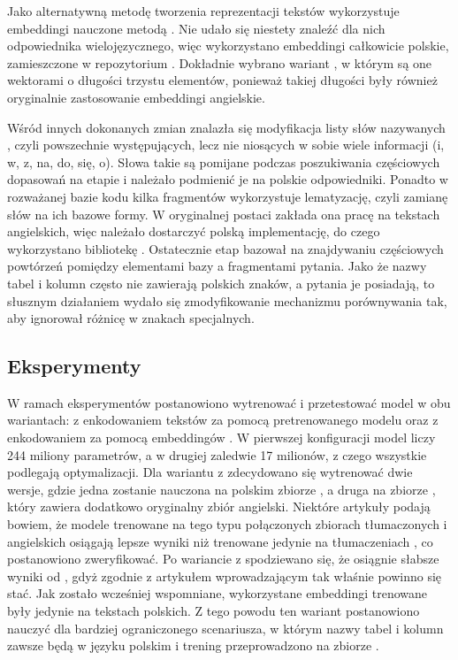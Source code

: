Jako alternatywną metodę tworzenia reprezentacji tekstów  wykorzystuje embeddingi nauczone metodą . Nie udało się niestety znaleźć dla nich odpowiednika wielojęzycznego, więc wykorzystano embeddingi całkowicie polskie, zamieszczone w repozytorium  . Dokładnie wybrano wariant , w którym są one wektorami o długości trzystu elementów, ponieważ takiej długości były również oryginalnie zastosowanie embeddingi angielskie.

Wśród innych dokonanych zmian znalazła się modyfikacja listy słów nazywanych , czyli powszechnie występujących, lecz nie niosących w sobie wiele informacji (i, w, z, na, do, się, o). Słowa takie są pomijane podczas poszukiwania częściowych dopasowań na etapie  i należało podmienić je na polskie odpowiedniki. Ponadto w rozważanej bazie kodu kilka fragmentów wykorzystuje lematyzację, czyli zamianę słów na ich bazowe formy. W oryginalnej postaci zakłada ona pracę na tekstach angielskich, więc należało dostarczyć polską implementację, do czego wykorzystano bibliotekę . Ostatecznie etap  bazował na znajdywaniu częściowych powtórzeń pomiędzy elementami bazy a fragmentami pytania. Jako że nazwy tabel i kolumn często nie zawierają polskich znaków, a pytania je posiadają, to słusznym działaniem wydało się zmodyfikowanie mechanizmu porównywania tak, aby ignorował różnicę w znakach specjalnych.

\subsection{Eksperymenty}

W ramach eksperymentów postanowiono wytrenować i przetestować model  w obu wariantach: z enkodowaniem tekstów za pomocą pretrenowanego modelu  oraz z enkodowaniem za pomocą embeddingów . W pierwszej konfiguracji model liczy 244 miliony parametrów, a w drugiej zaledwie 17 milionów, z czego wszystkie podlegają optymalizacji. Dla wariantu z  zdecydowano się wytrenować dwie wersje, gdzie jedna zostanie nauczona na polskim zbiorze , a druga na zbiorze , który zawiera dodatkowo oryginalny zbiór angielski. Niektóre artykuły podają bowiem, że modele trenowane na tego typu połączonych zbiorach tłumaczonych i angielskich osiągają lepsze wyniki niż trenowane jedynie na tłumaczeniach , co postanowiono zweryfikować. Po wariancie z  spodziewano się, że osiągnie słabsze wyniki od , gdyż zgodnie z artykułem wprowadzającym  tak właśnie powinno się stać. Jak zostało wcześniej wspomniane, wykorzystane embeddingi  trenowane były jedynie na tekstach polskich. Z tego powodu ten wariant postanowiono nauczyć dla bardziej ograniczonego scenariusza, w którym nazwy tabel i kolumn zawsze będą w języku polskim i trening przeprowadzono na zbiorze .

